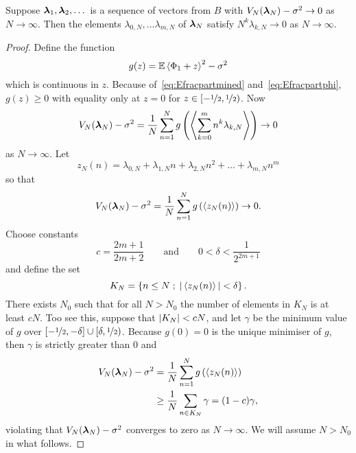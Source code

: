 \documentclass[journal]{IEEEtran}
\begin{document}
\begin{lemma}\label{lem:moran2}
Suppose $\boldsymbol{\lambda}_1, \boldsymbol{\lambda}_2,\dots$ is a sequence of vectors from $B$ with $V_N(\boldsymbol{\lambda}_N) - \sigma^2\rightarrow 0$ as $N\rightarrow\infty$. Then the elements $\lambda_{0,N}, \dots \lambda_{m,N}$ of $\boldsymbol{\lambda}_N$ satisfy $N^k\lambda_{k, N}\rightarrow0$ as $N\rightarrow\infty$.
\end{lemma}
\begin{proof}
Define the function
\begin{equation}\label{eq:gz}
g(z) = \expect\fracpart{\Phi_1 + z}^2 - \sigma^2
\end{equation}
which is continuous in $z$. Because of~\eqref{eq:Efracpartmined} and~\eqref{eq:Efracpartphi}, $g(z) \geq 0$ with equality only at $z = 0$ for $z \in [-\nicefrac{1}{2}, \nicefrac{1}{2})$. Now
\[
V_N(\boldsymbol{\lambda}_N) - \sigma^2 = \frac{1}{N}\sum_{n=1}^{N} g\left( \left\langle  \sum_{k=0}^{m}{n^k \lambda_{k,N}}  \right\rangle \right) \rightarrow 0
\]
as $N \rightarrow \infty$. Let
\[
z_N(n) = \lambda_{0,N} + \lambda_{1,N} n + \lambda_{2,N} n^2 + \dots + \lambda_{m,N} n^m
\]
so that
\[
V_N(\boldsymbol{\lambda}_N) - \sigma^2 = \frac{1}{N}\sum_{n=1}^{N} g\left( \left\langle z_N(n) \right\rangle \right) \rightarrow 0.
\]
Choose constants 
\[
c = \frac{2m+1}{2m+2} \qquad \text{and} \qquad 0 < \delta < \frac{1}{2^{2m+1}}
\]
and define the set 
\[
K_{N}=\left\{  n\leq N \; ; \; \vert \left\langle z_N(n) \right\rangle \vert < \delta \right\}.
\]
There exists $N_0$ such that for all $N > N_0$ the number of elements in $K_N$ is at least $cN$.  Too see this, suppose that $\vert K_N \vert < cN$, and let $\gamma$ be the minimum value of $g$ over $[-\nicefrac{1}{2},-\delta] \cup [\delta, \nicefrac{1}{2})$. Because $g(0) = 0$ is the unique minimiser of $g$, then $\gamma$ is strictly greater than $0$ and
\begin{align*}
V_N(\boldsymbol{\lambda}_N) - \sigma^2 &= \frac{1}{N}\sum_{n=1}^{N} g\left( \left\langle z_N(n) \right\rangle \right) \\
&\geq \frac{1}{N}\sum_{n\in K_N} \gamma = (1-c)\gamma,
\end{align*}
violating that $V_N(\boldsymbol{\lambda}_N) - \sigma^2$ converges to zero as $N \rightarrow \infty$.  We will assume $N > N_0$ in what follows.


\end{proof}
\end{document}
